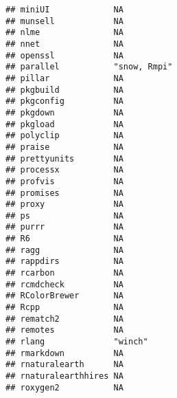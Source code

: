 \documentclass[
]{article}
\begin{document}
\begin{verbatim}
## miniUI             NA                                                     
## munsell            NA                                                     
## nlme               NA                                                     
## nnet               NA                                                     
## openssl            NA                                                     
## parallel           "snow, Rmpi"                                           
## pillar             NA                                                     
## pkgbuild           NA                                                     
## pkgconfig          NA                                                     
## pkgdown            NA                                                     
## pkgload            NA                                                     
## polyclip           NA                                                     
## praise             NA                                                     
## prettyunits        NA                                                     
## processx           NA                                                     
## profvis            NA                                                     
## promises           NA                                                     
## proxy              NA                                                     
## ps                 NA                                                     
## purrr              NA                                                     
## R6                 NA                                                     
## ragg               NA                                                     
## rappdirs           NA                                                     
## rcarbon            NA                                                     
## rcmdcheck          NA                                                     
## RColorBrewer       NA                                                     
## Rcpp               NA                                                     
## rematch2           NA                                                     
## remotes            NA                                                     
## rlang              "winch"                                                
## rmarkdown          NA                                                     
## rnaturalearth      NA                                                     
## rnaturalearthhires NA                                                     
## roxygen2           NA                                                     

\end{verbatim}
\end{document}
